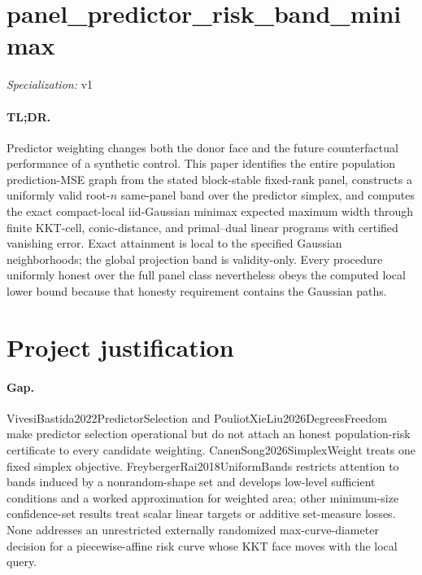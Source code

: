 \documentclass{article}
\begin{document}
\sloppy

\section*{panel\_\allowbreak{}predictor\_\allowbreak{}risk\_\allowbreak{}band\_\allowbreak{}minimax}

\noindent\textit{Specialization:} v1\par

\paragraph{TL;DR.} Predictor weighting changes both the donor face and the future counterfactual performance of a synthetic control. This paper identifies the entire population prediction-MSE graph from the stated block-stable fixed-rank panel, constructs a uniformly valid root-\(n\) same-panel band over the predictor simplex, and computes the exact compact-local iid-Gaussian minimax expected maximum width through finite KKT-cell, conic-distance, and primal--dual linear programs with certified vanishing error. Exact attainment is local to the specified Gaussian neighborhoods; the global projection band is validity-only. Every procedure uniformly honest over the full panel class nevertheless obeys the computed local lower bound because that honesty requirement contains the Gaussian paths.

\section{Project justification}

\paragraph{Gap.} VivesiBastida2022PredictorSelection and PouliotXieLiu2026DegreesFreedom make predictor selection operational but do not attach an honest population-risk certificate to every candidate weighting. CanenSong2026SimplexWeight treats one fixed simplex objective. FreybergerRai2018UniformBands restricts attention to bands induced by a nonrandom-shape set and develops low-level sufficient conditions and a worked approximation for weighted area; other minimum-size confidence-set results treat scalar linear targets or additive set-measure losses. None addresses an unrestricted externally randomized max-curve-diameter decision for a piecewise-affine risk curve whose KKT face moves with the local query.
\end{document}
